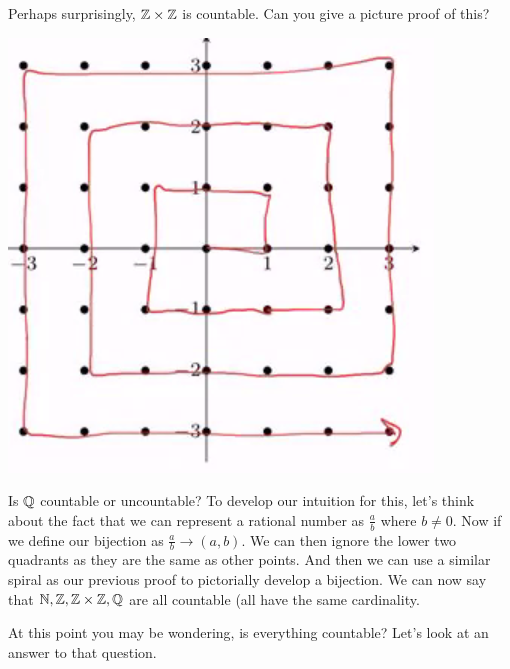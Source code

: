 \begin{example}
Perhaps surprisingly, $\mathbb{Z} \times \mathbb{Z}$ is countable. Can you give a picture proof of this?
\begin{center}
    \includegraphics[scale=.25]{notes/images/picture_proof.PNG}
\end{center}
\end{example}

\begin{example}
Is $\mathbb{Q}$ countable or uncountable? To develop our intuition for this, let's think about the fact that we can represent a rational number as $\frac{a}{b}$ where $b \neq 0$. Now if we define our bijection as $\frac{a}{b} \to (a, b)$. We can then ignore the lower two quadrants as they are the same as other points. And then we can use a similar spiral as our previous proof to pictorially develop a bijection. We can now say that $\mathbb{N}, \mathbb{Z}, \mathbb{Z} \times \mathbb{Z}, \mathbb{Q}$ are all countable (all have the same cardinality. 
\end{example}

At this point you may be wondering, is everything countable? Let's look at an answer to that question. 

